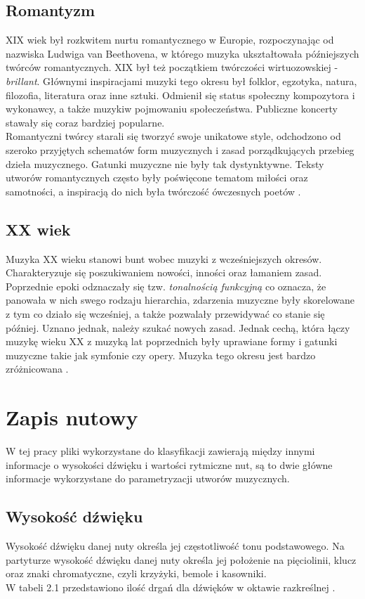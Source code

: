 \documentclass[printmode, eng]{mgr}
\newcommand\tab[1][1cm]{\hspace*{#1}}
\begin{document}
\subsection{Romantyzm}
\tab XIX wiek był rozkwitem nurtu romantycznego w Europie, rozpoczynając od nazwiska Ludwiga van Beethovena, w którego muzyka ukształtowała późniejszych twórców romantycznych. XIX był też początkiem twórczości wirtuozowskiej - \textit{brillant}. Głównymi inspiracjami muzyki tego okresu był folklor, egzotyka, natura, filozofia, literatura oraz inne sztuki. Odmienił się status społeczny kompozytora i wykonawcy, a także muzyki\linebreak w pojmowaniu społeczeństwa. Publiczne koncerty stawały się coraz bardziej popularne.\\
\tab Romantyczni twórcy starali się tworzyć swoje unikatowe style, odchodzono od szeroko przyjętych schematów form muzycznych i zasad porządkujących przebieg dzieła muzycznego. Gatunki muzyczne nie były tak dystynktywne. Teksty utworów romantycznych często były poświęcone tematom miłości oraz samotności, a inspiracją do nich była twórczość ówczesnych poetów \cite{rom}.
\subsection{XX wiek}
\tab Muzyka XX wieku stanowi bunt wobec muzyki z wcześniejszych okresów. Charakteryzuje się poszukiwaniem nowości, inności oraz łamaniem zasad. Poprzednie epoki odznaczały się tzw. \textit{tonalnością funkcyjną} co oznacza, że panowała w nich swego rodzaju hierarchia, zdarzenia muzyczne były skorelowane z tym co działo się wcześniej, a także pozwalały przewidywać co stanie się później. Uznano jednak, należy szukać nowych zasad. Jednak cechą, która łączy muzykę wieku XX z muzyką lat poprzednich były uprawiane formy i gatunki muzyczne takie jak symfonie czy opery. Muzyka tego okresu jest bardzo zróżnicowana \cite{xx}. 
\section{Zapis nutowy}
\tab W tej pracy pliki wykorzystane do klasyfikacji zawierają między innymi informacje o wysokości dźwięku i wartości rytmiczne nut, są to dwie główne informacje wykorzystane do parametryzacji utworów muzycznych.
\subsection{Wysokość dźwięku}
\tab Wysokość dźwięku danej nuty określa jej częstotliwość tonu podstawowego. Na partyturze wysokość dźwięku danej nuty określa jej położenie na pięciolinii, klucz oraz znaki chromatyczne, czyli krzyżyki, bemole i kasowniki.\\ W tabeli 2.1 przedstawiono ilość drgań dla dźwięków w oktawie razkreślnej \cite{wys}. 
\end{document}

